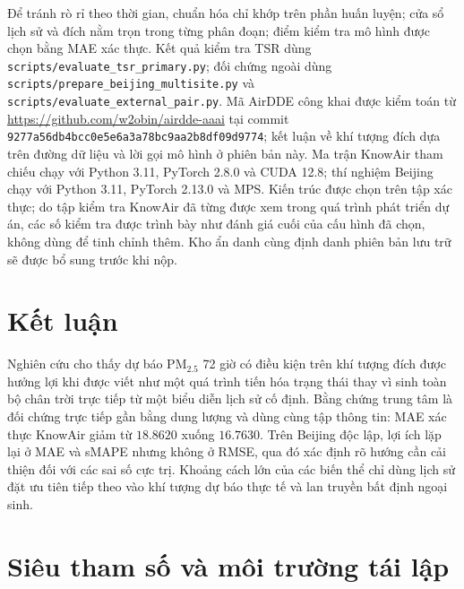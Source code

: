 \documentclass[10pt,a4paper]{article}
\newcommand{\pmfine}{PM$_{2.5}$}
\newcommand{\modelname}{TSR}
\begin{document}
Để tránh rò rỉ theo thời gian, chuẩn hóa chỉ khớp trên phần huấn luyện; cửa sổ lịch sử và đích nằm trọn trong từng phân đoạn; điểm kiểm tra mô hình được chọn bằng MAE xác thực. Kết quả kiểm tra \modelname{} dùng \texttt{scripts/evaluate\_tsr\_primary.py}; đối chứng ngoài dùng \texttt{scripts/prepare\_beijing\_multisite.py} và \texttt{scripts/evaluate\_external\_pair.py}. Mã AirDDE công khai được kiểm toán từ \url{https://github.com/w2obin/airdde-aaai} tại commit \texttt{9277a56db4bcc0e5e6a3a78bc9aa2b8df09d9774}; kết luận về khí tượng đích dựa trên đường dữ liệu và lời gọi mô hình ở phiên bản này. Ma trận KnowAir tham chiếu chạy với Python 3.11, PyTorch 2.8.0 và CUDA 12.8; thí nghiệm Beijing chạy với Python 3.11, PyTorch 2.13.0 và MPS. Kiến trúc được chọn trên tập xác thực; do tập kiểm tra KnowAir đã từng được xem trong quá trình phát triển dự án, các số kiểm tra được trình bày như đánh giá cuối của cấu hình đã chọn, không dùng để tinh chỉnh thêm. Kho ẩn danh cùng định danh phiên bản lưu trữ sẽ được bổ sung trước khi nộp.

\section{Kết luận}

Nghiên cứu cho thấy dự báo \pmfine{} 72 giờ có điều kiện trên khí tượng đích được hưởng lợi khi được viết như một quá trình tiến hóa trạng thái thay vì sinh toàn bộ chân trời trực tiếp từ một biểu diễn lịch sử cố định. Bằng chứng trung tâm là đối chứng trực tiếp gần bằng dung lượng và dùng cùng tập thông tin: MAE xác thực KnowAir giảm từ $18.8620$ xuống $16.7630$. Trên Beijing độc lập, lợi ích lặp lại ở MAE và sMAPE nhưng không ở RMSE, qua đó xác định rõ hướng cần cải thiện đối với các sai số cực trị. Khoảng cách lớn của các biến thể chỉ dùng lịch sử đặt ưu tiên tiếp theo vào khí tượng dự báo thực tế và lan truyền bất định ngoại sinh.

\FloatBarrier
\appendix

\section{Siêu tham số và môi trường tái lập}
\end{document}
